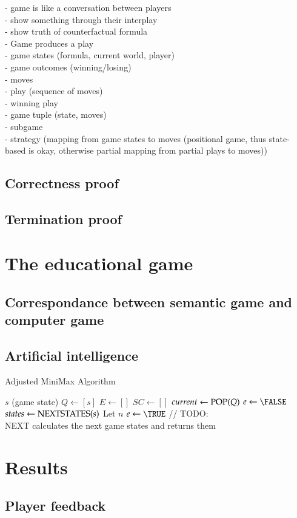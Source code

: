 \documentclass[a4paper,american]{paper}
\theoremstyle{definition}\newtheorem{definition}{Definition}
\begin{document}
- game is like a conversation between players\\
- show something through their interplay\\
- show truth of counterfactual formula\\
- Game produces a play\\
- game states (formula, current world, player)\\
- game outcomes (winning/losing)\\
- moves\\
- play (sequence of moves)\\
- winning play\\
- game tuple (state, moves)\\
- subgame\\
- strategy (mapping from game states to moves (positional game, thus state-based is okay, otherwise partial mapping from partial plays to moves))\\
\subsection{Correctness proof}
\subsection{Termination proof}

\section{The educational game}
\subsection{Correspondance between semantic game and computer game}
\subsection{Artificial intelligence}
\begin{algorithm}[H]
\caption{Adjusted MiniMax Algorithm}\label{alg:minimax}
\begin{algorithmic}
\Require $s$ (game state)
	\State $Q \gets [s]$
	\State $E \gets []$
	\State $SC \gets []$
		\State $current \gets \Call{POP}{Q}$
		\State $e \gets \FALSE$
		\State $states \gets \Call{NEXTSTATES}{s}$
		\State Let $n$
			\State {}
			\State $e \gets \TRUE$
						\State {}
					\EndIf
					\State {}
				\EndIf
			\EndFor
		\EndIf
			// TODO:
		\EndIf
	\EndWhile
\EndFunction\\
NEXT calculates the next game states and returns them
\end{algorithmic}
\end{algorithm}
\section{Results}
\subsection{Player feedback}

\nocite{*}

\end{document}
